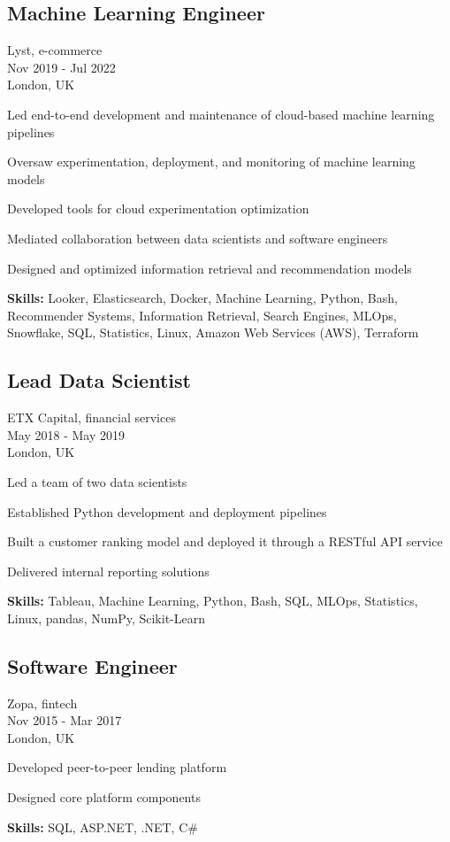 \documentclass[a4paper,10pt]{article}
\begin{document}
\subsection*{Machine Learning Engineer}
Lyst, e-commerce \\
Nov 2019 - Jul 2022 \\
London, UK
\begin{bulletlist}
    \item Led end-to-end development and maintenance of cloud-based machine learning pipelines
    \item Oversaw experimentation, deployment, and monitoring of machine learning models
    \item Developed tools for cloud experimentation optimization
    \item Mediated collaboration between data scientists and software engineers
    \item Designed and optimized information retrieval and recommendation models
\end{bulletlist}
\textbf{Skills:} Looker, Elasticsearch, Docker, Machine Learning, Python, Bash, Recommender Systems, Information Retrieval, Search Engines, MLOps, Snowflake, SQL, Statistics, Linux, Amazon Web Services (AWS), Terraform

\subsection*{Lead Data Scientist}
ETX Capital, financial services \\
May 2018 - May 2019 \\
London, UK
\begin{bulletlist}
    \item Led a team of two data scientists
    \item Established Python development and deployment pipelines
    \item Built a customer ranking model and deployed it through a RESTful API service
    \item Delivered internal reporting solutions
\end{bulletlist}
\textbf{Skills: }Tableau, Machine Learning, Python, Bash, SQL, MLOps, Statistics, Linux, pandas, NumPy, Scikit-Learn

\subsection*{Software Engineer}
Zopa, fintech \\
Nov 2015 - Mar 2017 \\
London, UK
\begin{bulletlist}
    \item Developed peer-to-peer lending platform
    \item Designed core platform components
\end{bulletlist}
\textbf{Skills:} SQL, ASP.NET, .NET, C\#
\end{document}
